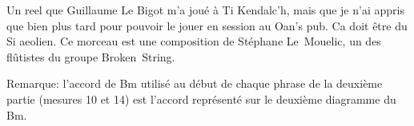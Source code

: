 Un reel que Guillaume Le Bigot m'a joué à Ti Kendalc'h, mais que je n'ai appris
que bien plus tard pour pouvoir le jouer en session au Oan's pub. Ca doit être
du Si aeolien. Ce morceau est une composition de Stéphane Le~Mouelic, un des
flûtistes du groupe Broken~String.


\tune

Remarque: l'accord de Bm utilisé au début de chaque phrase de la deuxième
partie (mesures 10 et 14) est l'accord représenté sur le deuxième diagramme du
Bm.


